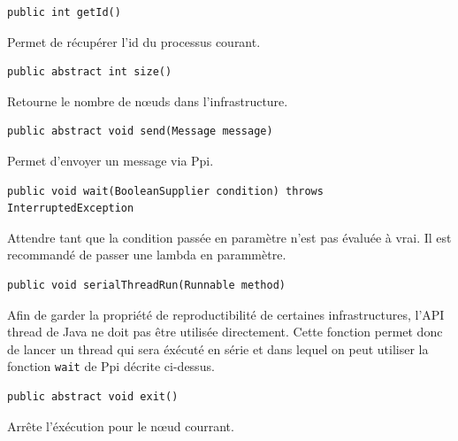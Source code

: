 \documentclass{article}
\begin{document}
\noindent\begin{minipage}{\linewidth}
\begin{lstlisting}
public int getId()
\end{lstlisting}
Permet de récupérer l'id du processus courant.
\bigskip
\end{minipage}

\noindent\begin{minipage}{\linewidth}
\begin{lstlisting}
public abstract int size()
\end{lstlisting}
Retourne le nombre de n\oe uds dans l'infrastructure.
\bigskip
\end{minipage}

\noindent\begin{minipage}{\linewidth}
\begin{lstlisting}
public abstract void send(Message message)
\end{lstlisting}
Permet d'envoyer un message via Ppi.
\bigskip
\end{minipage}

\noindent\begin{minipage}{\linewidth}
\begin{lstlisting}
public void wait(BooleanSupplier condition) throws InterruptedException
\end{lstlisting}
Attendre tant que la condition passée en paramètre n'est pas évaluée à vrai. Il est recommandé de
passer une lambda en parammètre.
\bigskip
\end{minipage}

\noindent\begin{minipage}{\linewidth}
\begin{lstlisting}
public void serialThreadRun(Runnable method)
\end{lstlisting}
Afin de garder la propriété de reproductibilité de certaines infrastructures, l'API thread de Java
ne doit pas être utilisée directement. Cette fonction permet donc de lancer un thread qui sera
éxécuté en série et dans lequel on peut utiliser la fonction \lstinline{wait} de Ppi décrite ci-dessus.
\bigskip
\end{minipage}

\noindent\begin{minipage}{\linewidth}
\begin{lstlisting}
public abstract void exit()
\end{lstlisting}
Arrête l'éxécution pour le n\oe ud courrant.
\bigskip
\end{minipage}
		\newpage
\end{document}
